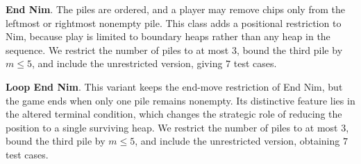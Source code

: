 \documentclass[review]{elsarticle}
\newcommand{\set}[1]{\{ #1 \}}
\newcommand{\tuple}[1]{\langle {#1} \rangle}
\newcommand{\true}{\top}
\newcommand{\statevar}{\mathcal{X}}
\newcommand{\act}{\mathcal{A}}
\newcommand{\constraint}{\mathcal{C}}
\newcommand{\estate}{\mathcal{E}}
\newcommand{\pre}{\mathtt{pre}}
\newcommand{\eff}{\mathtt{eff}}
\begin{document}
\textbf{End Nim}. The piles are ordered, and a player may remove chips only from the leftmost or rightmost nonempty pile.
This class adds a positional restriction to Nim, because play is limited to boundary heaps rather than any heap in the sequence.
We restrict the number of piles to at most $3$, bound the third pile by $m \le 5$, and include the unrestricted version, giving $7$ test cases.

\textbf{Loop End Nim}. This variant keeps the end-move restriction of End Nim, but the game ends when only one pile remains nonempty.
Its distinctive feature lies in the altered terminal condition, which changes the strategic role of reducing the position to a single surviving heap.
We restrict the number of piles to at most $3$, bound the third pile by $m \le 5$, and include the unrestricted version, obtaining $7$ test cases.
\end{document}
